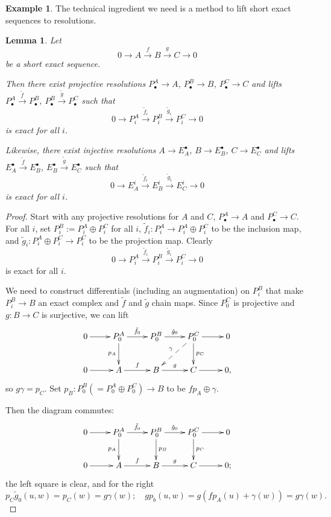 \documentclass{amsart}[12pt]
\numberwithin{equation}{section}
\theoremstyle{plain} %
\newtheorem{lem}[equation]{Lemma}
\theoremstyle{definition}
\newtheorem{ex}[equation]{Example}
\theoremstyle{remark}
\newcommand{\xra}[1]{\xrightarrow{#1}}
\begin{document}
\begin{ex}
    The technical ingredient we need is a method to lift short exact sequences to resolutions.
    
    \begin{lem} Let 
    \[ 0 \to A \xra{f} B \xra{g} C \to 0\]
    be a short exact sequence. 
    
    Then there exist projective resolutions
  $P_\bullet^A \to A$, $P_\bullet^B\to B$, $P_\bullet^C \to C$ and lifts $P_\bullet^A \xra{\tilde{f}} P_\bullet^B$, $P_\bullet^B \xra{\tilde{g}} P_\bullet^C$ such that 
   \[ 0 \to P_i^A \xra{\tilde{f}_i} P_i^B \xra{\tilde{g}_i} P_i^C \to 0\] is exact for all $i$. 
   
   Likewise, there exist injective resolutions
  $A \to E_A^\bullet$, $B \to E_B^\bullet$, $C \to E_C^\bullet$ and lifts $E_A^\bullet \xra{\tilde{f}} E_B^\bullet$, $E_B^\bullet \xra{\tilde{g}} E_C^\bullet$ such that 
   \[ 0 \to E_A^i \xra{\tilde{f}_i} E_B^i \xra{\tilde{g}_i} E_C^i \to 0\] is exact for all $i$. 
   \end{lem}


   \begin{proof}
   Start with any projective resolutions for $A$ and $C$, $P_\bullet^A \to A$ and $P_\bullet^C \to C$. For all $i$, set $P_i^B := P_i^A \oplus P_i^C$ for all $i$, $\tilde{f}_i: P_i^A \to P_i^A \oplus P_i^C$ to be the inclusion map, and $\tilde{g}_i: P_i^A \oplus P_i^C \to P_i^C$ to be the projection map. Clearly 
      \[ 0 \to P_i^A \xra{\tilde{f}_i} P_i^B \xra{\tilde{g}_i} P_i^C \to 0\] is exact for all $i$. 
      
      We need to construct differentials (including an augmentation) on $P_i^B$ that make $P_i^B\to B$ an exact complex and $\tilde{f}$ and $\tilde{g}$ chain maps. Since $P_0^C$ is projective and $g:B\to C$ is surjective, we can lift
      \[ \xymatrix{ 0 \ar[r] & P_0^A \ar[r]^{\tilde{f}_0} \ar[d]_{p_A} & P_0^B \ar[r]^{\tilde{g}_0}  & P_0^C \ar[r] \ar[d]^{p_C} \ar@{-->}[dl]_{\gamma} & 0 \\ 
      0 \ar[r] & A \ar[r]^f &  B \ar[r]^g &  C \ar[r] & 0,}\]
      so $g \gamma= p_C$.
      Set $p_B: P^B_0 (=P^A_0 \oplus P_0^C) \to B$ to be $f p_A \oplus \gamma$.

Then the diagram commutes:
 \[ \xymatrix{ 0 \ar[r] & P_0^A \ar[r]^{\tilde{f}_0} \ar[d]_{p_A} & P_0^B \ar[r]^{\tilde{g}_0} \ar[d]^{p_B}  & P_0^C \ar[r] \ar[d]^{p_C}  & 0 \\ 
      0 \ar[r] & A \ar[r]^f &  B \ar[r]^g &  C \ar[r] & 0;}\]
      the left square is clear, and for the right
      \[ p_C \tilde{g}_0 (u,w) =p_C(w) = g \gamma (w); \quad g p_b(u,w) = g(f p_A(u) + \gamma(w)) = g \gamma(w).\]
      

\end{proof}
\end{ex}
\end{document}
